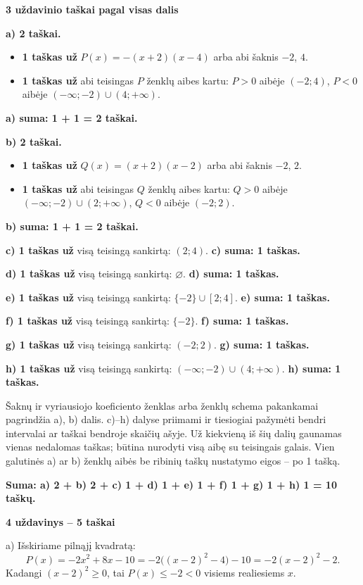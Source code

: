 \documentclass[11pt]{article}
\newcommand{\sk}[1]{\par\medskip\textbf{#1}\par}
\begin{document}
\sk{3 uždavinio taškai pagal visas dalis}
\textbf{a) 2 taškai.}\begin{itemize}
\item \textbf{1 taškas už} $P(x)=-(x+2)(x-4)$ arba abi šaknis $-2$, $4$.
\item \textbf{1 taškas už} abi teisingas $P$ ženklų aibes kartu: $P>0$ aibėje $(-2;4)$, $P<0$ aibėje $(-\infty;-2)\cup(4;+\infty)$.
\end{itemize}
\textbf{a) suma: 1 + 1 = 2 taškai.}
\par\textbf{b) 2 taškai.}\begin{itemize}
\item \textbf{1 taškas už} $Q(x)=(x+2)(x-2)$ arba abi šaknis $-2$, $2$.
\item \textbf{1 taškas už} abi teisingas $Q$ ženklų aibes kartu: $Q>0$ aibėje $(-\infty;-2)\cup(2;+\infty)$, $Q<0$ aibėje $(-2;2)$.
\end{itemize}
\textbf{b) suma: 1 + 1 = 2 taškai.}
\par\textbf{c) 1 taškas už} visą teisingą sankirtą: $(2;4)$. \textbf{c) suma: 1 taškas.}
\par\textbf{d) 1 taškas už} visą teisingą sankirtą: $\varnothing$. \textbf{d) suma: 1 taškas.}
\par\textbf{e) 1 taškas už} visą teisingą sankirtą: $\{-2\}\cup[2;4]$. \textbf{e) suma: 1 taškas.}
\par\textbf{f) 1 taškas už} visą teisingą sankirtą: $\{-2\}$. \textbf{f) suma: 1 taškas.}
\par\textbf{g) 1 taškas už} visą teisingą sankirtą: $(-2;2)$. \textbf{g) suma: 1 taškas.}
\par\textbf{h) 1 taškas už} visą teisingą sankirtą: $(-\infty;-2)\cup(4;+\infty)$. \textbf{h) suma: 1 taškas.}
\par Šaknų ir vyriausiojo koeficiento ženklas arba ženklų schema pakankamai pagrindžia a), b) dalis. c)--h) dalyse priimami ir tiesiogiai pažymėti bendri intervalai ar taškai bendroje skaičių ašyje. Už kiekvieną iš šių dalių gaunamas vienas nedalomas taškas; būtina nurodyti visą aibę su teisingais galais. Vien galutinės a) ar b) ženklų aibės be ribinių taškų nustatymo eigos -- po 1 tašką.\par\textbf{Suma: a) 2 + b) 2 + c) 1 + d) 1 + e) 1 + f) 1 + g) 1 + h) 1 = 10 taškų.}\newpage

\sk{4 uždavinys -- 5 taškai}
a) Išskiriame pilnąjį kvadratą:
\[P(x)=- 2 x^{2} + 8 x - 10=-2\bigl((x-2)^2-4\bigr)-10=-2(x-2)^2-2.\]
Kadangi $(x-2)^2\ge0$, tai $P(x)\le-2<0$ visiems realiesiems $x$.
\end{document}
